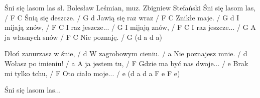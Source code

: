 Śni się lasom las
sł. Bolesław Leśmian, muz. Zbigniew Stefański
Śni się lasom las, / F C
Śnią się deszcze. / G d
Jawią się raz wraz / F C
Znikłe maje. / G d
I mijają znów, / F C
I raz jeszcze... / G
I mijają znów, / F C
I raz jeszcze... / G
A ja własnych snów / F C
Nie poznaję. / G (d a d a)

Dłoń zanurzasz w śnie, / d
W zagrobowym cieniu. / a
Nie poznajesz mnie. / d
Wołasz po imieniu! / a
A ja jestem tu, / F
Gdzie ma być nas dwoje... / e
Brak mi tylko tchu, / F
Oto ciało moje... / e (d a d a F e F e)

Śni się lasom las...